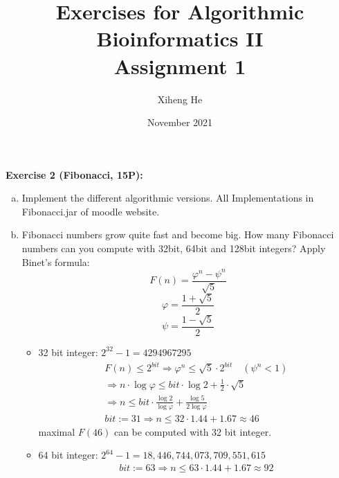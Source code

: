 \documentclass{article}
\title{Exercises for Algorithmic Bioinformatics II\\
Assignment 1}
\author{Xiheng He}
\date{November 2021}
\begin{document}
{\let\newpage\relax\maketitle}
\begin{flushleft}
\textbf{Exercise 2 (Fibonacci, 15P):}
\begin{enumerate}[(a)]
    \item  Implement the different algorithmic versions.
    \newline All Implementations in Fibonacci.jar of moodle website.
    \item  Fibonacci numbers grow quite fast and become big. How many Fibonacci numbers can you
    compute with 32bit, 64bit and 128bit integers?
    \newline
    Apply Binet's formula:
    \begin{equation}
        F(n) = \frac{\varphi^n - \psi ^n}{\sqrt{5}}
    \end{equation}
    \begin{equation}
        \varphi = \frac{1 + \sqrt{5}}{2}
    \end{equation}
    \begin{equation}
        \psi = \frac{1 - \sqrt{5}}{2}
    \end{equation}
    \begin{itemize}
        \item 32 bit integer: $2^{32} - 1 = 4294967295$ 
        \newline
        \begin{align*}
        F(n) \leq 2 ^ {bit} \Longrightarrow
        \varphi ^ n \leq \sqrt{5} \cdot 2 ^ {bit} \quad (\psi ^ n < 1) \\ 
        \Longrightarrow n \cdot \log \varphi \leq {bit} \cdot \log 2 + \frac{1}{2} \cdot \sqrt{5} \\
        \Longrightarrow n \leq {bit} \cdot \frac{\log 2}{\log \varphi} + \frac{\log 5}{2 \log \varphi} \\
        bit := 31 \Longrightarrow n \leq 32 \cdot 1.44 + 1.67 \approx 46
        \end{align*}
        maximal $F(46)$ can be computed with 32 bit integer.
        \item 64 bit integer: $2^{64} - 1 = 18,446,744,073,709,551,615$
        \begin{align*}
            bit := 63 \Longrightarrow n \leq 63 \cdot 1.44 + 1.67 \approx 92
        \end{align*}

\end{itemize}
\end{enumerate}
\end{flushleft}
\end{document}
